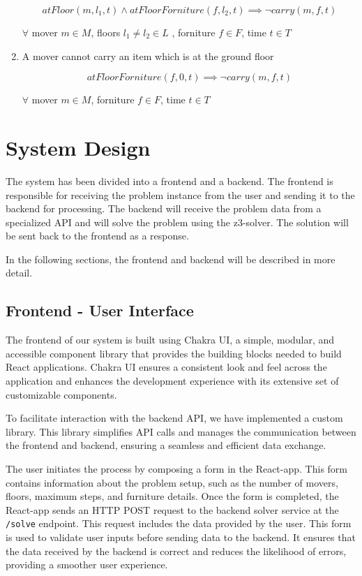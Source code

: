 \documentclass[a4paper, 11pt]{article}
\begin{document}
\begin{enumerate}
	      $$atFloor(m, l_1,t) \land atFloorForniture(f, l_2, t) \implies \lnot carry(m, f, t)$$

	      $\forall$ mover $m \in M$, floors $l_1 \neq l_2 \in L$ , forniture $f \in F$, time $t \in T$

	\item A mover cannot carry an item which is at the ground floor

	      $$atFloorForniture(f, 0, t) \implies \lnot carry(m, f, t)$$

	      $\forall$ mover $m \in M$, forniture $f \in F$, time $t \in T$


\end{enumerate}

\pagebreak

\section{System Design}
The system has been divided into a frontend and a backend. The frontend is responsible for receiving the problem instance from the user and sending it to the backend for processing. The backend will receive the problem data from a specialized API and will solve the problem using the z3-solver. The solution will be sent back to the frontend as a response.

In the following sections, the frontend and backend will be described in more detail.

\subsection{Frontend - User Interface}
The frontend of our system is built using Chakra UI, a simple, modular, and accessible component library that provides the building blocks needed to build React applications. Chakra UI ensures a consistent look and feel across the application and enhances the development experience with its extensive set of customizable components.

To facilitate interaction with the backend API, we have implemented a custom library. This library simplifies API calls and manages the communication between the frontend and backend, ensuring a seamless and efficient data exchange.

The user initiates the process by composing a form in the React-app. This form contains information about the problem setup, such as the number of movers, floors, maximum steps, and furniture details. Once the form is completed, the React-app sends an HTTP POST request to the backend solver service at the \texttt{/solve} endpoint. This request includes the data provided by the user. This form is used to validate user inputs before sending data to the backend. It ensures that the data received by the backend is correct and reduces the likelihood of errors, providing a smoother user experience.
\end{document}

